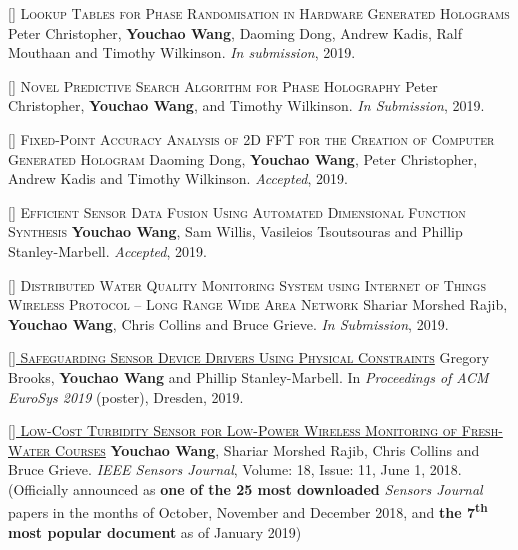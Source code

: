 \documentclass[11pt,a4paper]{moderncv}
\begin{document}
\addtocounter{counter}{1}


\textsc{[] Lookup Tables for Phase Randomisation in Hardware Generated Holograms}
\newline Peter Christopher, \textbf{Youchao Wang}, Daoming Dong, Andrew Kadis, Ralf Mouthaan and Timothy Wilkinson. \textit{In submission}, 2019.

\addtocounter{counter}{1}

\textsc{[] Novel Predictive Search Algorithm for Phase Holography}
\newline Peter Christopher, \textbf{Youchao Wang}, and Timothy Wilkinson. \textit{In Submission}, 2019.

\addtocounter{counter}{1}

\textsc{[] Fixed-Point Accuracy Analysis of 2D FFT for the Creation of Computer Generated Hologram}
\newline  Daoming Dong, \textbf{Youchao Wang}, Peter Christopher, Andrew Kadis and Timothy Wilkinson. \textit{Accepted}, 2019.

\addtocounter{counter}{1}

\textsc{[] Efficient Sensor Data Fusion Using Automated Dimensional Function Synthesis}
\newline  \textbf{Youchao Wang}, Sam Willis, Vasileios Tsoutsouras and Phillip Stanley-Marbell. \textit{Accepted}, 2019.

\addtocounter{counter}{1}

\textsc{[] Distributed Water Quality Monitoring System using Internet of Things Wireless Protocol – Long Range Wide Area Network}
\newline  Shariar Morshed Rajib, \textbf{Youchao Wang}, Chris Collins and Bruce Grieve. \textit{In Submission}, 2019.

\addtocounter{counter}{1}

\href{https://www.eurosys2019.org/wp-content/uploads/2019/03/eurosys19posters-abstract77.pdf}{\textsc{[] Safeguarding Sensor Device Drivers Using Physical Constraints}}
\newline  Gregory Brooks, \textbf{Youchao Wang} and Phillip Stanley-Marbell. In \textit{Proceedings of ACM EuroSys 2019} (poster), Dresden, 2019.

\addtocounter{counter}{1}

\href{https://ieeexplore.ieee.org/document/8337739}{\textsc{[] Low-Cost Turbidity Sensor for Low-Power Wireless Monitoring of Fresh-Water Courses}}
\newline  \textbf{Youchao Wang}, Shariar Morshed Rajib, Chris Collins and Bruce Grieve. \textit{IEEE Sensors Journal}, Volume: 18, Issue: 11, June 1, 2018. (Officially announced as \textbf{one of the 25 most downloaded} \textit{Sensors Journal} papers in the months of October, November and December 2018, and \textbf{the 7\textsuperscript{th} most popular document} as of January 2019)
\end{document}
